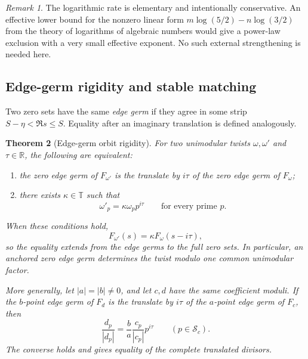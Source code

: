 \documentclass[11pt]{article}
\newtheorem{theorem}{Theorem}[section]
\theoremstyle{definition}
\theoremstyle{remark}
\newtheorem{remark}[theorem]{Remark}
\newcommand{\R}{\mathbb R}
\begin{document}
\begin{remark}
The logarithmic rate is elementary and intentionally conservative.
An effective lower bound for the nonzero linear form
$m\log(5/2)-n\log(3/2)$ from the theory of logarithms of algebraic
numbers would give a power-law exclusion with a very small effective
exponent.  No such external strengthening is needed here.
\end{remark}

\subsection{Edge-germ rigidity and stable matching}

Two zero sets have the same \emph{edge germ} if they agree in some strip
$S-\eta<\Re s\le S$.  Equality after an imaginary translation is
defined analogously.

\begin{theorem}[Edge-germ orbit rigidity]
\label{thm:edge-germ-rigidity}
For two unimodular twists $\omega,\omega'$ and $\tau\in\R$, the
following are equivalent:
\begin{enumerate}[label=\textup{(\roman*)}]
 \item the zero edge germ of $F_{\omega'}$ is the translate by $i\tau$
       of the zero edge germ of $F_\omega$;
 \item there exists $\kappa\in\mathbb T$ such that
       \begin{equation}
        \omega'_p=\kappa\omega_p p^{i\tau}
        \qquad\text{for every prime }p.
        \label{eq:zero-germ-orbit}
       \end{equation}
\end{enumerate}
When these conditions hold,
\[
 F_{\omega'}(s)=\kappa F_\omega(s-i\tau),
\]
so the equality extends from the edge germs to the full zero sets.
In particular, an anchored zero edge germ determines the twist modulo
one common unimodular factor.

More generally, let $|a|=|b|\ne0$, and let $c,d$ have the same
coefficient moduli.  If the $b$-point edge germ of $F_d$ is the translate
by $i\tau$ of the $a$-point edge germ of $F_c$, then
\begin{equation}
 \frac{d_p}{|d_p|}
 =\frac ba\frac{c_p}{|c_p|}p^{i\tau}
 \qquad(p\in\mathcal S_c).
 \label{eq:a-germ-orbit}
\end{equation}
The converse holds and gives equality of the complete translated
divisors.
\end{theorem}
\end{document}
